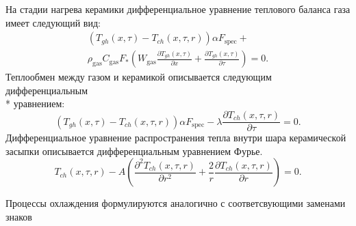 \documentclass[a4paper,11pt,numreferences,mathsec,kaplist]{isuepsutf8}
\begin{document}
\begin{article}
На стадии нагрева керамики дифференциальное уравнение теплового баланса
газа имеет следующий вид:
\begin{equation}
    \begin{array}{cc}
        \left( T_{gh}(x,\tau) - T_{ch}(x,\tau,r) \right) \alpha F_{\text{spec}}+\\
        \rho_{\text{gas}} C_{\text{gas}} F_{*}
        \left( W_{\text{gas}} \frac{\partial T_{gh} (x, \tau)}{\partial x} + 
        \frac{\partial T_{gh} (x, \tau)}{\partial \tau} \right) = 0.
    \end{array}
    \label{gasheat}
\end{equation}
Теплообмен между газом и керамикой описывается следующим дифференциальным
\\* уравнением: 
\begin{equation}
    \left( T_{gh}(x,\tau) - T_{ch}(x,\tau,r) \right) \alpha F_{\text{spec}}-
    \lambda \frac{\partial T_{ch} (x, \tau, r)}{\partial \tau} = 0.
    \label{surfheat}
\end{equation}
Дифференциальное уравнение распространения тепла внутри шара
керамической засыпки описывается дифференциальным уравнением Фурье.\cite{K1970}
\begin{equation}
    T_{ch}(x,\tau,r) - A \left( 
    \frac{ \partial^2 T_{ch}(x,\tau,r)}{\partial r^2} +
    \frac{2}{r} \frac{ \partial T_{ch}(x,\tau,r)}{\partial r} \right) = 0.
    \label{cerheat}
\end{equation}

Процессы охлаждения формулируются аналогично с соответсвующими
заменами знаков


\end{article}
\end{document}
